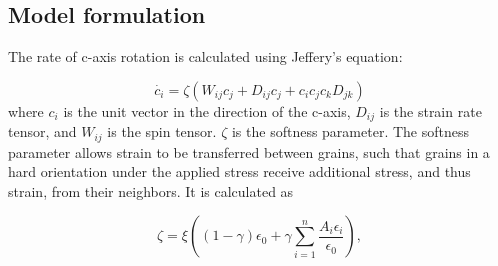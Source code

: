 \documentclass[a0,landscape]{a0poster}
\begin{document}
\begin{multicols}{3}




\subsection*{Model formulation}
The rate of c-axis rotation is calculated using Jeffery's equation:

\begin{equation}
   \dot{c_i} = \zeta \left( W_{ij}  c_j + D_{ij} c_j + c_i c_j c_k D_{jk} \right)
\end{equation}
where $c_i$ is the unit vector in the direction of the c-axis, $D_{ij}$ is the strain rate tensor, and $W_{ij}$ is the spin tensor. $\zeta$ is the softness parameter. The softness parameter allows strain to be transferred between grains, such that grains in a hard orientation under the applied stress receive additional stress, and thus strain, from their neighbors. It is calculated as

\begin{equation}
\zeta = \xi \left( \left( 1 - \gamma \right)  \epsilon_0 + \gamma \sum_{i=1}^n \frac{A_i \epsilon_i}{\epsilon_0} \right),
\end{equation}


\end{multicols}
\end{document}

